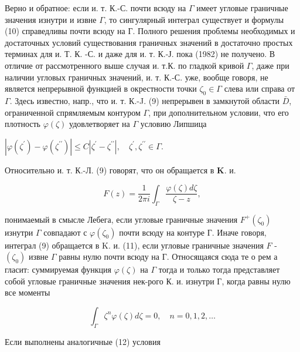 \documentclass[10pt]{article}
\begin{document}
Верно и обратное: если и. т. К.-С. почти всюду на $\Gamma$ имеет угловые граничные значения изнутри и извне $\Gamma$, то сингулярный интеграл существует и формулы (10) справедливы почти всюду на Г. Полного решения проблемы необходимых и достаточных условий существования граничных значений в достаточно простых терминах для и. Т. К. -С. и даже для и. т. К.-Ј. пока (1982) не получено. В отличие от рассмотренного выше случая и. т.К. по гладкой кривой $\Gamma$, даже при наличии угловых граничных значений, и. т. К.-С. уже, вообще говоря, не является непрерывной функцией в окрестности точки $\zeta_{0} \in \Gamma$ слева или справа от $\Gamma$. Здесь известно, напр., что и. т. К.-J. (9) непрерывен в замкнутой области $\bar{D}$, ограниченной спрямляемым контуром $\Gamma$, при дополнительном условии, что его плотность $\varphi(\zeta)$ удовлетворяет на $\Gamma$ условию Липшица



$\left|\varphi\left(\zeta^{\prime}\right)-\varphi\left(\zeta^{\prime \prime}\right)\right| \leqslant C\left|\zeta^{\prime}-\zeta^{\prime \prime}\right|, \quad \zeta^{\prime}, \zeta^{\prime \prime} \in \Gamma$.



Относительно и. т. К.-Л. (9) говорят, что он обращается в $\mathbf{K}$. и.



\[

F(z)=\frac{1}{2 \pi i} \int_{\Gamma} \frac{\varphi(\zeta) d \zeta}{\zeta-z},

\]



понимаемый в смысле Лебега, если угловые граничные значения $F^{+}\left(\zeta_{0}\right)$ изнутри $\Gamma$ совпадают с $\varphi\left(\zeta_{0}\right)$ почти всюду на контуре Г. Иначе говоря, интеграл (9) обращается в K. и. (11), если угловые граничные значения $F$ - $\left(\zeta_{0}\right)$ извне $\Gamma$ равны нулю почти всюду на $Г$. Относящаяся сюда те о рем а гласит: суммируемая функция $\varphi(\zeta)$ на $\Gamma$ тогда и только тогда представляет собой угловые граничные значения нек-рого К. и. изнутри Г, когда равны нулю все моменты



\[

\int_{\Gamma} \zeta^{n} \varphi(\zeta) d \zeta=0, \quad n=0,1,2, \ldots

\]



Если выполнены аналогичные (12) условия
\end{document}
